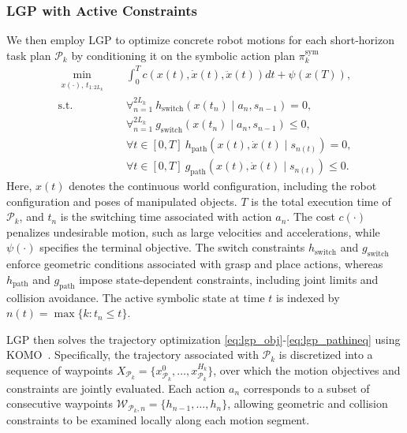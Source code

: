 \documentclass[letterpaper, 10 pt, conference]{ieeeconf}  %
\begin{document}
\subsubsection{LGP with Active Constraints}
We then employ LGP to optimize concrete robot motions for each short-horizon task plan $\mathcal{P}_k$ by conditioning it on the symbolic action plan $\pi_k^{\mathrm{sym}}$ 
\begin{align}
\min_{\substack{x(\cdot),\,t_{1:2L_k}}}\quad
&\int_0^{T} c\!\left(x(t),\dot{x}(t),\ddot{x}(t)\right)dt + \psi \left(x(T)\right),
\label{eq:lgp_obj}\\
\text{s.t.}\quad
&\forall_{n=1}^{2L_k}\ h_{\mathrm{switch}}\!\left(x(t_n)\mid a_n,s_{n-1}\right)=0,
\label{eq:lgp_sweq}\\
&\forall_{n=1}^{2L_k}\ g_{\mathrm{switch}}\!\left(x(t_n)\mid a_n,s_{n-1}\right)\le 0,
\label{eq:lgp_swineq}\\
&\forall t\in[0,T]\ h_{\mathrm{path}}\left(x(t),\dot{x}(t)\mid s_{n(t)}\right)=0,
\label{eq:lgp_patheq}\\
&\forall t\in[0,T]\ g_{\mathrm{path}}\left(x(t),\dot{x}(t)\mid s_{n(t)}\right)\le 0.
\label{eq:lgp_pathineq}
\end{align}
Here, $x(t)$ denotes the continuous world configuration, including the robot configuration and poses of manipulated objects.
$T$ is the total execution time of $\mathcal{P}_k$, and $t_n$ is the switching time associated with action $a_n$. 
The cost $c(\cdot)$ penalizes undesirable motion, such as large velocities and accelerations, while $\psi(\cdot)$ specifies the terminal objective. 
The switch constraints $h_{\mathrm{switch}}$ and $g_{\mathrm{switch}}$ enforce geometric conditions associated with grasp and place actions, whereas $h_{\mathrm{path}}$ and $g_{\mathrm{path}}$ impose state-dependent constraints, including joint limits and collision avoidance.
The active symbolic state at time $t$ is indexed by $n(t) = \max\{k : t_n \leq t\}$.

LGP then solves the trajectory optimization \eqref{eq:lgp_obj}-\eqref{eq:lgp_pathineq} using KOMO~\cite{marc2015LGP}. 
Specifically, the trajectory associated with $\mathcal{P}_k$ is discretized into a sequence of waypoints $ X_{\mathcal{P}_k} = \{x_{\mathcal{P}_k}^{0},\ldots,x_{\mathcal{P}_k}^{H_k}\}$, over which the motion objectives and constraints are jointly evaluated. 
Each action $a_n$ corresponds to a subset of consecutive waypoints $\mathcal{W}_{\mathcal{P}_k,n} = \{h_{n-1}, \ldots, h_n \}$, allowing geometric and collision constraints to be examined locally along each motion segment.
\end{document}
